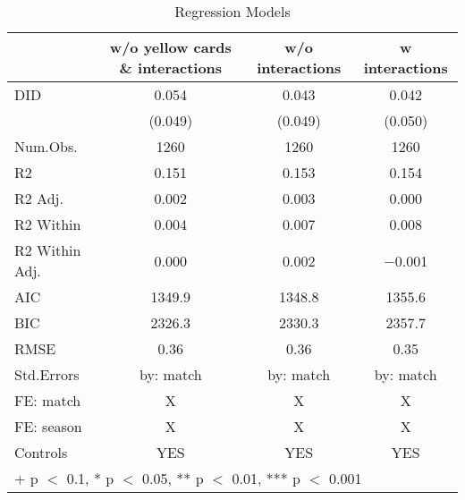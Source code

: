 \begin{table}

\caption{Regression Models}
\centering
\begin{tabular}[t]{lccc}
\toprule
  & w/o yellow cards \& interactions & w/o interactions & w interactions\\
\midrule
DID & \num{0.054} & \num{0.043} & \num{0.042}\\
 & (\num{0.049}) & (\num{0.049}) & (\num{0.050})\\
\midrule
Num.Obs. & \num{1260} & \num{1260} & \num{1260}\\
R2 & \num{0.151} & \num{0.153} & \num{0.154}\\
R2 Adj. & \num{0.002} & \num{0.003} & \num{0.000}\\
R2 Within & \num{0.004} & \num{0.007} & \num{0.008}\\
R2 Within Adj. & \num{0.000} & \num{0.002} & \num{-0.001}\\
AIC & \num{1349.9} & \num{1348.8} & \num{1355.6}\\
BIC & \num{2326.3} & \num{2330.3} & \num{2357.7}\\
RMSE & \num{0.36} & \num{0.36} & \num{0.35}\\
Std.Errors & by: match & by: match & by: match\\
FE: match & X & X & X\\
FE: season & X & X & X\\
Controls & YES & YES & YES\\
\bottomrule
\multicolumn{4}{l}{\rule{0pt}{1em}+ p $<$ 0.1, * p $<$ 0.05, ** p $<$ 0.01, *** p $<$ 0.001}\\
\end{tabular}
\end{table}
